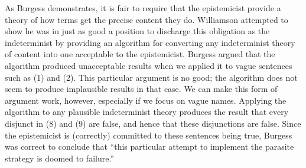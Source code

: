 As Burgess demonstrates, it is fair to require that the epistemicist provide a theory of how terms get the precise content they do. Williamson attempted to show he was in just as good a position to discharge this obligation as the indeterminist by providing an algorithm for converting any indeterminist theory of content into one acceptable to the epistemicist. Burgess argued that the algorithm produced unacceptable results when we applied it to vague sentences such as (1) and (2). This particular argument is no good; the algorithm does not seem to produce implausible results in that case. We can make this form of argument work, however, especially if we focus on vague names. Applying the algorithm to any plausible indeterminist theory produces the result that every disjunct in (8) and (9) are false, and hence that these disjunctions are false. Since the epistemicist is (correctly) committed to these sentences being true, Burgess was correct to conclude that ``this particular attempt to implement the parasite strategy is doomed to failure.''

%

%

%

%

%

